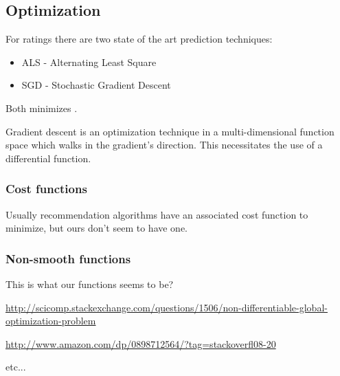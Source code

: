 
\subsection{Optimization}

For ratings there are two state of the art prediction techniques:

\begin{itemize}
    \item ALS - Alternating Least Square
    \item SGD - Stochastic Gradient Descent
\end{itemize}

Both minimizes \rmse.

Gradient descent is an optimization technique in a multi-dimensional function space which walks in the gradient's direction.  This necessitates the use of a differential function.


\subsubsection{Cost functions}

Usually recommendation algorithms have an associated cost function to minimize, but ours don't seem to have one.


\subsubsection{Non-smooth functions}

This is what our functions seems to be?

\url{http://scicomp.stackexchange.com/questions/1506/non-differentiable-global-optimization-problem}

\url{http://www.amazon.com/dp/0898712564/?tag=stackoverfl08-20}

etc...

